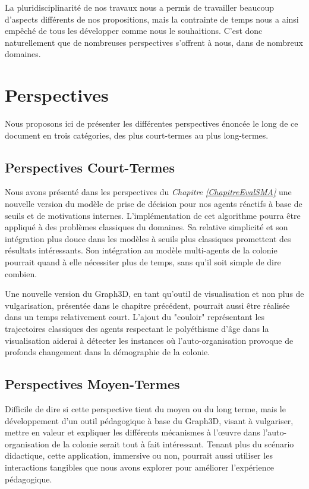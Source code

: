 	 La pluridisciplinarité de nos travaux nous a permis de travailler beaucoup d'aspects différents de nos propositions, mais la contrainte de temps nous a ainsi empêché de tous les développer comme nous le souhaitions. C'est donc naturellement que de nombreuses perspectives s'offrent à nous, dans de nombreux domaines.
	
\section*{Perspectives}
	Nous proposons ici de présenter les différentes perspectives énoncée le long de ce document en trois catégories, des plus court-termes au plus long-termes.
	
	\subsection{Perspectives Court-Termes}	
	Nous avons présenté dans les perspectives du \textit{Chapitre \ref{ChapitreEvalSMA}} une nouvelle version du modèle de prise de décision pour nos agents réactifs à base de seuils et de motivations internes. L'implémentation de cet algorithme pourra être appliqué à des problèmes classiques du domaines. Sa relative simplicité et son intégration plus douce dans les modèles à seuils plus classiques promettent des résultats intéressants. Son intégration au modèle multi-agents de la colonie pourrait quand à elle nécessiter plus de temps, sans qu'il soit simple de dire combien.
	
	Une nouvelle version du Graph3D, en tant qu'outil de visualisation et non plus de vulgarisation, présentée dans le chapitre précédent, pourrait aussi être réalisée dans un temps relativement court. L'ajout du "couloir" représentant les trajectoires classiques des agents respectant le polyéthisme d'âge dans la visualisation aiderai à détecter les instances où l'auto-organisation provoque de profonds changement dans la démographie de la colonie.
	\subsection{Perspectives Moyen-Termes}	
	Difficile de dire si cette perspective tient du moyen ou du long terme, mais le développement d'un outil pédagogique à base du Graph3D, visant à vulgariser, mettre en valeur et expliquer les différents mécanismes à l'œuvre dans l'auto-organisation de la colonie serait tout à fait intéressant. Tenant plus du scénario didactique, cette application, immersive ou non, pourrait aussi utiliser les interactions tangibles que nous avons explorer pour améliorer l'expérience pédagogique.
